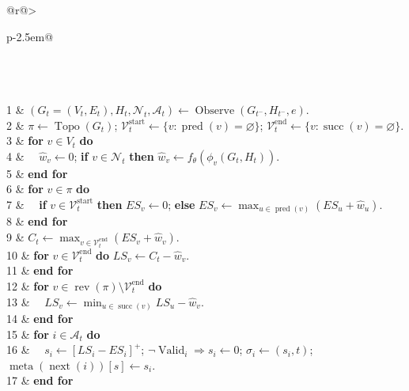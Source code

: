 \begin{algorithm}[t]
\caption{Online GBDT--CPM Slack update}
\label{alg:slack-update}
\begin{tabular}{@{}r@{\hspace{0.5em}}>{\raggedright\arraybackslash}p{\dimexpr\columnwidth-2.5em\relax}@{}}
\\
\\
\\
1 & $(G_t=(V_t,E_t),H_t,\mathcal N_t,\mathcal A_t)\gets\operatorname{Observe}(G_{t^-},H_{t^-},e)$.\\
2 & $\pi\gets\operatorname{Topo}(G_t)$; $\mathcal V_t^{\mathrm{start}}\gets\{v:\operatorname{pred}(v)=\varnothing\}$; $\mathcal V_t^{\mathrm{end}}\gets\{v:\operatorname{succ}(v)=\varnothing\}$.\\
3 & \textbf{for} $v\in V_t$ \textbf{do}\\
4 & $\quad\hat w_v\gets0$; \textbf{if} $v\in\mathcal N_t$ \textbf{then} $\hat w_v\gets f_\theta(\phi_v(G_t,H_t))$.\\
5 & \textbf{end for}\\
6 & \textbf{for} $v\in\pi$ \textbf{do}\\
7 & $\quad$\textbf{if} $v\in\mathcal V_t^{\mathrm{start}}$ \textbf{then} $ES_v\gets0$; \textbf{else} $ES_v\gets\max_{u\in\operatorname{pred}(v)}(ES_u+\hat w_u)$.\\
8 & \textbf{end for}\\
9 & $C_t\gets\max_{v\in\mathcal V_t^{\mathrm{end}}}(ES_v+\hat w_v)$.\\
10 & \textbf{for} $v\in\mathcal V_t^{\mathrm{end}}$ \textbf{do} $LS_v\gets C_t-\hat w_v$.\\
11 & \textbf{end for}\\
12 & \textbf{for} $v\in\operatorname{rev}(\pi)\setminus\mathcal V_t^{\mathrm{end}}$ \textbf{do}\\
13 & $\quad LS_v\gets\min_{u\in\operatorname{succ}(v)}LS_u-\hat w_v$.\\
14 & \textbf{end for}\\
15 & \textbf{for} $i\in\mathcal A_t$ \textbf{do}\\
16 & $\quad s_i\gets[LS_i-ES_i]^+$; $\neg\operatorname{Valid}_i\Rightarrow s_i\gets0$; $\sigma_i\gets(s_i,t)$; $\operatorname{meta}(\operatorname{next}(i))[s]\gets s_i$.\\
17 & \textbf{end for}\\
\end{tabular}
\end{algorithm}
